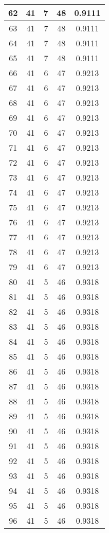 \documentclass[letterpaper, 12pt]{article}
\begin{document}
\begin{longtable}{|c|c|c|c|c|}
\hline
62 & 41 & 7 & 48 & 0.9111 \\
\hline
63 & 41 & 7 & 48 & 0.9111 \\
\hline
64 & 41 & 7 & 48 & 0.9111 \\
\hline
65 & 41 & 7 & 48 & 0.9111 \\
\hline
66 & 41 & 6 & 47 & 0.9213 \\
\hline
67 & 41 & 6 & 47 & 0.9213 \\
\hline
68 & 41 & 6 & 47 & 0.9213 \\
\hline
69 & 41 & 6 & 47 & 0.9213 \\
\hline
70 & 41 & 6 & 47 & 0.9213 \\
\hline
71 & 41 & 6 & 47 & 0.9213 \\
\hline
72 & 41 & 6 & 47 & 0.9213 \\
\hline
73 & 41 & 6 & 47 & 0.9213 \\
\hline
74 & 41 & 6 & 47 & 0.9213 \\
\hline
75 & 41 & 6 & 47 & 0.9213 \\
\hline
76 & 41 & 6 & 47 & 0.9213 \\
\hline
77 & 41 & 6 & 47 & 0.9213 \\
\hline
78 & 41 & 6 & 47 & 0.9213 \\
\hline
79 & 41 & 6 & 47 & 0.9213 \\
\hline
80 & 41 & 5 & 46 & 0.9318 \\
\hline
81 & 41 & 5 & 46 & 0.9318 \\
\hline
82 & 41 & 5 & 46 & 0.9318 \\
\hline
83 & 41 & 5 & 46 & 0.9318 \\
\hline
84 & 41 & 5 & 46 & 0.9318 \\
\hline
85 & 41 & 5 & 46 & 0.9318 \\
\hline
86 & 41 & 5 & 46 & 0.9318 \\
\hline
87 & 41 & 5 & 46 & 0.9318 \\
\hline
88 & 41 & 5 & 46 & 0.9318 \\
\hline
89 & 41 & 5 & 46 & 0.9318 \\
\hline
90 & 41 & 5 & 46 & 0.9318 \\
\hline
91 & 41 & 5 & 46 & 0.9318 \\
\hline
92 & 41 & 5 & 46 & 0.9318 \\
\hline
93 & 41 & 5 & 46 & 0.9318 \\
\hline
94 & 41 & 5 & 46 & 0.9318 \\
\hline
95 & 41 & 5 & 46 & 0.9318 \\
\hline
96 & 41 & 5 & 46 & 0.9318 \\

\end{longtable}
\end{document}
